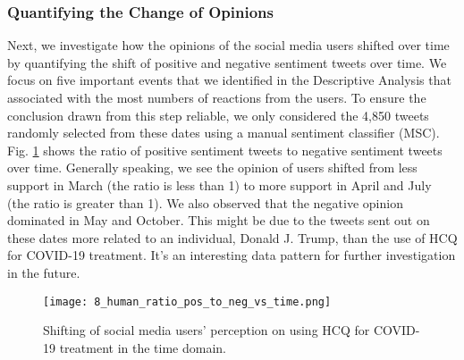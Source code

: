 \documentclass[conference]{IEEEtran}
\begin{document}
	\subsubsection{Quantifying the Change of Opinions}
	Next, we investigate how the opinions of the social media users shifted over time by quantifying the shift of positive and negative sentiment tweets over time. We focus on five important events that we identified in the Descriptive Analysis that associated with the most numbers of reactions from the users. To ensure the conclusion drawn from this step reliable, we only considered the 4,850 tweets randomly selected from these dates using a manual sentiment classifier (MSC). Fig. \ref{fig:human_ratio_pos_to_neg_vs_time} shows the ratio of positive sentiment tweets to negative sentiment tweets over time. Generally speaking, we see the opinion of users shifted from less support in March (the ratio is less than 1) to more support in April and July (the ratio is greater than 1). We also observed that the negative opinion dominated in May and October. This might be due to the tweets sent out on these dates more related to an individual, Donald J. Trump, than the use of HCQ for COVID-19 treatment. It's an interesting data pattern for further investigation in the future.
	
	\begin{figure}[tb]
		\centering
		\texttt{[image: 8\_human\_ratio\_pos\_to\_neg\_vs\_time.png]} 
		\caption{Shifting of social media users' perception on using HCQ for COVID-19 treatment in the time domain.} 
		\label{fig:human_ratio_pos_to_neg_vs_time} 
		\vspace{-0.2in}
	\end{figure}
	
\end{document}
